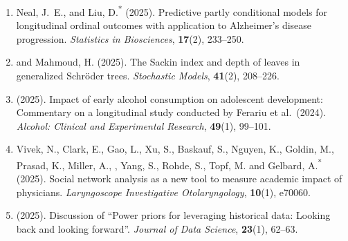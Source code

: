 \begin{enumerate}[resume=journalpubs]

\item\begin{pubentry} Neal, J.\ E., \PZnot{} and Liu, D.\textsuperscript{*} (2025). Predictive partly conditional models for longitudinal ordinal outcomes with application to Alzheimer's disease progression. \emph{Statistics in Biosciences}, \textbf{17}(2), 233--250.

\par\end{pubentry}
\item\begin{pubentry} \PZ{} and Mahmoud, H. (2025). The Sackin index and depth of leaves in generalized Schr\"{o}der trees. \emph{Stochastic Models}, \textbf{41}(2), 208--226.

\par\end{pubentry}
\item\begin{pubentry} \PZ{} (2025). Impact of early alcohol consumption on adolescent development: Commentary on a longitudinal study conducted by Ferariu et al.\ (2024). \emph{Alcohol: Clinical and Experimental Research}, \textbf{49}(1), 99--101.

\par\end{pubentry}
\item\begin{pubentry} Vivek, N., Clark, E., Gao, L., Xu, S., Baskauf, S., Nguyen, K., Goldin, M., Prasad, K., Miller, A., \PZnot{}, Yang, S., Rohde, S., Topf, M. and Gelbard, A.\textsuperscript{*} (2025). Social network analysis as a new tool to measure academic impact of physicians. \emph{Laryngoscope Investigative Otolaryngology}, \textbf{10}(1), e70060.

\par\end{pubentry}
\item\begin{pubentry} \PZ{} (2025). Discussion of ``Power priors for leveraging historical data: Looking back and looking forward''. \emph{Journal of Data Science}, \textbf{23}(1), 62--63.


\end{pubentry}
\end{enumerate}

